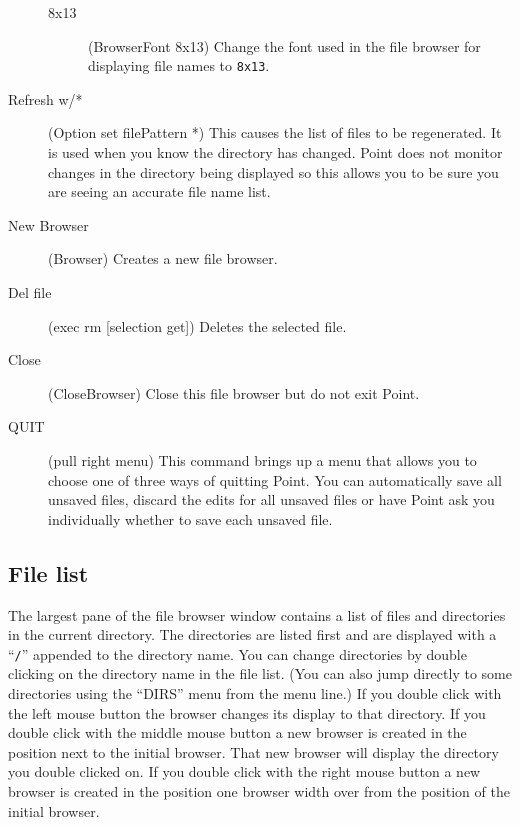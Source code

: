 \begin{description}
\begin{description}
	\item[8x13] (BrowserFont 8x13)
	Change the font used in the file browser for displaying
	file names to {\tt 8x13}.

	\end{description}

\item[ Refresh w/* ] (Option set filePattern *)
This causes the list of files to be regenerated.
It is used when you know the directory has changed.
Point does not monitor changes in the directory being
displayed so this allows you to be sure you are seeing
an accurate file name list.

\item[New Browser] (Browser)
Creates a new file browser.

\item[Del file] (exec rm [selection get])
Deletes the selected file.

\item[Close] (CloseBrowser)
Close this file browser but do not exit Point.

\item[QUIT] (pull right menu)
This command brings up a menu that allows you to choose one of
three ways of quitting Point.
You can automatically save all unsaved files,
discard the edits for all unsaved files
or have Point ask you individually whether to save
each unsaved file.

\end{description}



\subsection{File list}

The largest pane of the file browser window contains a list of files
and directories in the current directory.
The directories are listed first and are displayed with a ``{\tt /}''
appended to the directory name.
You can change directories by double clicking on the directory name
in the file list.
(You can also jump directly to some directories using the ``DIRS''
menu from the menu line.)
If you double click with the left mouse button the browser changes its
display to that directory.
If you double click with the middle mouse button a new browser is created
in the position next to the initial browser.
That new browser will display the directory you double clicked on.
If you double click with the right mouse button a new browser is created
in the position one browser width over from the position
of the initial browser.

